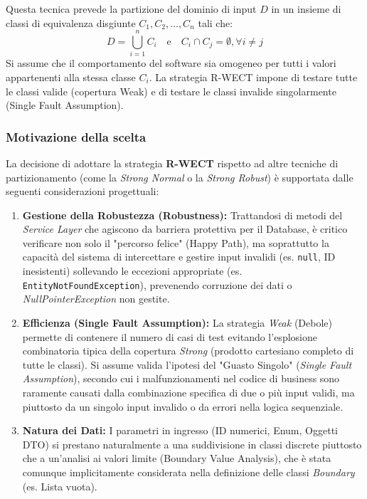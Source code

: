 \documentclass[a4paper,12pt]{article}
\begin{document}
Questa tecnica prevede la partizione del dominio di input $D$ in un insieme di classi di equivalenza disgiunte $C_1, C_2, \dots, C_n$ tali che:
\[
D = \bigcup_{i=1}^{n} C_i \quad \text{e} \quad C_i \cap C_j = \emptyset, \forall i \neq j
\]
Si assume che il comportamento del software sia omogeneo per tutti i valori appartenenti alla stessa classe $C_i$. La strategia R-WECT impone di testare tutte le classi valide (copertura Weak) e di testare le classi invalide singolarmente (Single Fault Assumption).

\subsubsection*{Motivazione della scelta}
La decisione di adottare la strategia \textbf{R-WECT} rispetto ad altre tecniche di partizionamento (come la \textit{Strong Normal} o la \textit{Strong Robust}) è supportata dalle seguenti considerazioni progettuali:

\begin{enumerate}
    \item \textbf{Gestione della Robustezza (Robustness):} 
    Trattandosi di metodi del \textit{Service Layer} che agiscono da barriera protettiva per il Database, è critico verificare non solo il "percorso felice" (Happy Path), ma soprattutto la capacità del sistema di intercettare e gestire input invalidi (es. \texttt{null}, ID inesistenti) sollevando le eccezioni appropriate (es. \texttt{EntityNotFoundException}), prevenendo corruzione dei dati o \textit{NullPointerException} non gestite.

    \item \textbf{Efficienza (Single Fault Assumption):} 
    La strategia \textit{Weak} (Debole) permette di contenere il numero di casi di test evitando l'esplosione combinatoria tipica della copertura \textit{Strong} (prodotto cartesiano completo di tutte le classi). 
    Si assume valida l'ipotesi del "Guasto Singolo" (\textit{Single Fault Assumption}), secondo cui i malfunzionamenti nel codice di business sono raramente causati dalla combinazione specifica di due o più input validi, ma piuttosto da un singolo input invalido o da errori nella logica sequenziale.

    \item \textbf{Natura dei Dati:} 
    I parametri in ingresso (ID numerici, Enum, Oggetti DTO) si prestano naturalmente a una suddivisione in classi discrete piuttosto che a un'analisi ai valori limite (Boundary Value Analysis), che è stata comunque implicitamente considerata nella definizione delle classi \textit{Boundary} (es. Lista vuota).
\end{enumerate}
\end{document}
